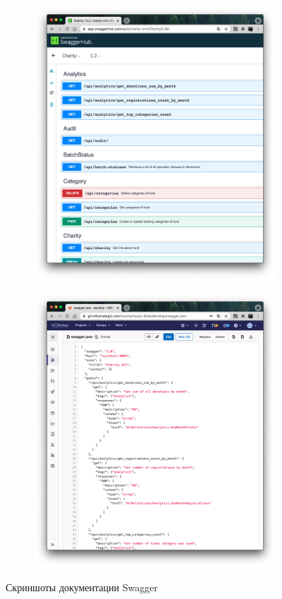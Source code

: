 \documentclass[a4paper,12pt,reqno]{article}
\begin{document}
\begin{figure}[H]
	    \centering
		\begin{subfigure}[b]{0.475\linewidth}
			\includegraphics[width=\linewidth]{img/swaggerhub.png}
		\end{subfigure}
		\begin{subfigure}[b]{0.475\linewidth}
			\includegraphics[width=\linewidth]{img/swaggerjson.png}
		\end{subfigure}
		\caption{Скриншоты документации Swagger}
		\label{pic: swagger}
\end{figure}
\end{document}
